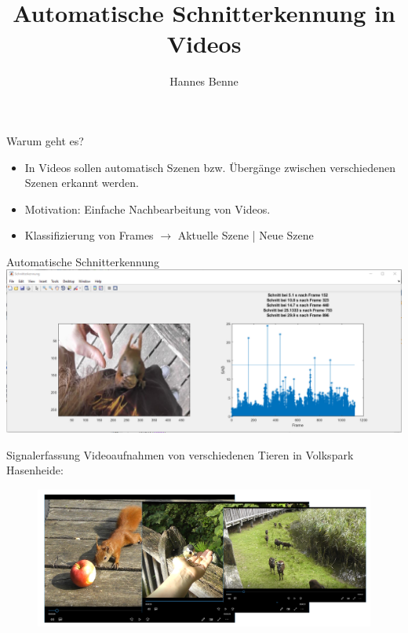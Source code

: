 \documentclass[11pt]{beamer}
\author{Hannes Benne}
\title{Automatische Schnitterkennung in Videos}
\begin{document}
\begin{frame}
\titlepage
\end{frame}


\begin{frame}{Warum geht es?}
\begin{itemize}
\item In Videos sollen automatisch Szenen bzw. Übergänge zwischen verschiedenen Szenen erkannt werden.
\item Motivation: Einfache Nachbearbeitung von Videos.
\item Klassifizierung von Frames $\rightarrow$ Aktuelle Szene | Neue Szene
\end{itemize}
\end{frame}

\begin{frame}{Automatische Schnitterkennung}
\includegraphics[scale=0.31]{sadstem2.png}
\end{frame}

\begin{frame}[t]{Signalerfassung}
Videoaufnahmen von verschiedenen Tieren in Volkspark Hasenheide:
\begin{figure}
	\centering
	\includegraphics[scale=0.15]{Signalerfassung}
\end{figure}
\end{frame}
\end{document}
